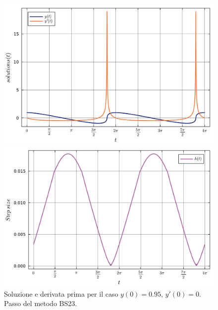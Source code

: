 \documentclass[letterpaper, 12pt]{article}
\numberwithin{equation}{section}    %
\begin{document}
\begin{figure}[!ht]
    \centering
    \begin{minipage}[b]{0.47\textwidth}
        \includegraphics[width=\textwidth]{6367.pdf}
    \end{minipage}
    \hspace{0.5cm}
    \begin{minipage}[b]{0.47\textwidth}
        \includegraphics[width=\textwidth]{6368.pdf}
    \end{minipage}
    \caption{Soluzione e derivata prima per il caso $y(0) = 0.95$, $y'(0) = 0$. Passo del metodo BS23.}
    \label{fig:es6_3_6_4}
\end{figure}
\end{document}
